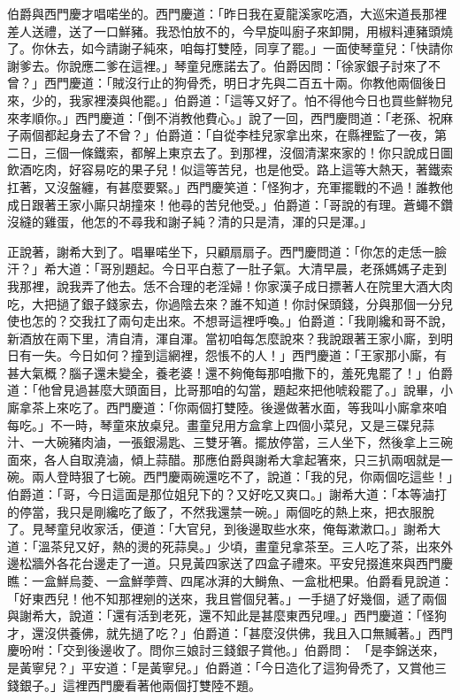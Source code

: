 伯爵與西門慶才唱喏坐的。西門慶道：「昨日我在夏龍溪家吃酒，大巡宋道長那裡差人送禮，送了一口鮮豬。我恐怕放不的，今早旋叫廚子來卸開，用椒料連豬頭燒了。你休去，如今請謝子純來，咱每打雙陸，同享了罷。」一面使琴童兒：「快請你謝爹去。你說應二爹在這裡。」琴童兒應諾去了。伯爵因問：「徐家銀子討來了不曾？」西門慶道：「賊沒行止的狗骨禿，明日才先與二百五十兩。你教他兩個後日來，少的，我家裡湊與他罷。」伯爵道：「這等又好了。怕不得他今日也買些鮮物兒來孝順你。」西門慶道：「倒不消教他費心。」說了一回，西門慶問道：「老孫、祝麻子兩個都起身去了不曾？」伯爵道：「自從李桂兒家拿出來，在縣裡監了一夜，第二日，三個一條鐵索，都解上東京去了。到那裡，沒個清潔來家的！你只說成日圖飲酒吃肉，好容易吃的果子兒！似這等苦兒，也是他受。路上這等大熱天，著鐵索扛著，又沒盤纏，有甚麼要緊。」西門慶笑道：「怪狗才，充軍擺戰的不過！誰教他成日跟著王家小廝只胡撞來！他尋的苦兒他受。」伯爵道：「哥說的有理。蒼蠅不鑽沒縫的雞蛋，他怎的不尋我和謝子純？清的只是清，渾的只是渾。」

正說著，謝希大到了。唱畢喏坐下，只顧扇扇子。西門慶問道：「你怎的走恁一臉汗？」希大道：「哥別題起。今日平白惹了一肚子氣。大清早晨，老孫媽媽子走到我那裡，說我弄了他去。恁不合理的老淫婦！你家漢子成日摽著人在院里大酒大肉吃，大把撾了銀子錢家去，你過陰去來？誰不知道！你討保頭錢，分與那個一分兒使也怎的？交我扛了兩句走出來。不想哥這裡呼喚。」伯爵道：「我剛纔和哥不說，新酒放在兩下里，清自清，渾自渾。當初咱每怎麼說來？我說跟著王家小廝，到明日有一失。今日如何？撞到這網裡，怨悵不的人！」西門慶道：「王家那小廝，有甚大氣概？腦子還未變全，養老婆！還不夠俺每那咱撒下的，羞死鬼罷了！」伯爵道：「他曾見過甚麼大頭面目，比哥那咱的勾當，題起來把他唬殺罷了。」說畢，小廝拿茶上來吃了。西門慶道：「你兩個打雙陸。後邊做著水面，等我叫小廝拿來咱每吃。」不一時，琴童來放桌兒。畫童兒用方盒拿上四個小菜兒，又是三碟兒蒜汁、一大碗豬肉滷，一張銀湯匙、三雙牙箸。擺放停當，三人坐下，然後拿上三碗面來，各人自取澆滷，傾上蒜醋。那應伯爵與謝希大拿起箸來，只三扒兩咽就是一碗。兩人登時狠了七碗。西門慶兩碗還吃不了，說道：「我的兒，你兩個吃這些！」伯爵道：「哥，今日這面是那位姐兒下的？又好吃又爽口。」謝希大道：「本等滷打的停當，我只是剛纔吃了飯了，不然我還禁一碗。」兩個吃的熱上來，把衣服脫了。見琴童兒收家活，便道：「大官兒，到後邊取些水來，俺每漱漱口。」謝希大道：「溫茶兒又好，熱的燙的死蒜臭。」少頃，畫童兒拿茶至。三人吃了茶，出來外邊松牆外各花台邊走了一道。只見黃四家送了四盒子禮來。平安兒掇進來與西門慶瞧：一盒鮮烏菱、一盒鮮荸薺、四尾冰湃的大鰣魚、一盒枇杷果。伯爵看見說道：「好東西兒！他不知那裡剜的送來，我且嘗個兒著。」一手撾了好幾個，遞了兩個與謝希大，說道：「還有活到老死，還不知此是甚麼東西兒哩。」西門慶道：「怪狗才，還沒供養佛，就先撾了吃？」伯爵道：「甚麼沒供佛，我且入口無贓著。」西門慶吩咐：「交到後邊收了。問你三娘討三錢銀子賞他。」伯爵問： 「是李錦送來，是黃寧兒？」平安道：「是黃寧兒。」伯爵道：「今日造化了這狗骨禿了，又賞他三錢銀子。」這裡西門慶看著他兩個打雙陸不題。

